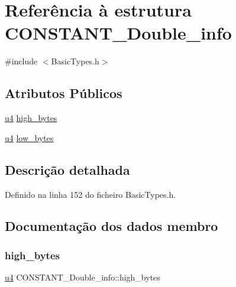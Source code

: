 \hypertarget{structCONSTANT__Double__info}{}\section{Referência à estrutura C\+O\+N\+S\+T\+A\+N\+T\+\_\+\+Double\+\_\+info}
\label{structCONSTANT__Double__info}


{\ttfamily \#include $<$Basic\+Types.\+h$>$}

\subsection*{Atributos Públicos}
\begin{DoxyCompactItemize}
\item 
\hyperlink{BasicTypes_8h_ae5be1f726785414dd1b77d60df074c9d}{u4} \hyperlink{structCONSTANT__Double__info_a598a15e5dbec46b4fb2546fd985a4028}{high\+\_\+bytes}
\item 
\hyperlink{BasicTypes_8h_ae5be1f726785414dd1b77d60df074c9d}{u4} \hyperlink{structCONSTANT__Double__info_acb94347bd17a80b4a11d6ee35ae1eee3}{low\+\_\+bytes}
\end{DoxyCompactItemize}


\subsection{Descrição detalhada}


Definido na linha 152 do ficheiro Basic\+Types.\+h.



\subsection{Documentação dos dados membro}
\mbox{\label{structCONSTANT__Double__info_a598a15e5dbec46b4fb2546fd985a4028}} 
\subsubsection{\texorpdfstring{high\+\_\+bytes}{high\_bytes}}
{\footnotesize\ttfamily \hyperlink{BasicTypes_8h_ae5be1f726785414dd1b77d60df074c9d}{u4} C\+O\+N\+S\+T\+A\+N\+T\+\_\+\+Double\+\_\+info\+::high\+\_\+bytes}



